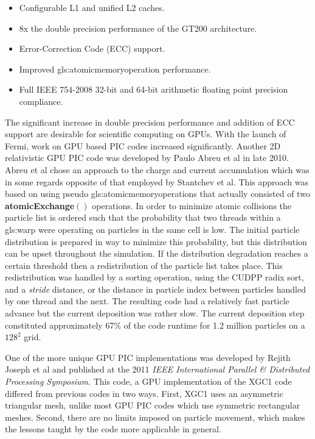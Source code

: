 \begin{itemize}
\singlespacing
\item Configurable L1 and unified L2 caches.
\item 8x the double precision performance of the GT200 architecture. 
\item Error-Correction Code (ECC) support. 
\item Improved \gls{gls:atomicmemoryoperation} performance.
\item Full IEEE 754-2008 32-bit and 64-bit arithmetic floating point precision compliance. 
\end{itemize}

The significant increase in double precision performance and addition of ECC support are desirable for scientific computing on GPUs. With the launch of Fermi, work on GPU based PIC codes increased significantly. Another 2D relativistic GPU PIC code was developed by Paulo Abreu et al in late 2010.\cite{Abreu2011} Abreu et al chose an approach to the charge and current accumulation which was in some regards opposite of that employed by Stantchev et al. This approach was based on using pseudo \glspl{gls:atomicmemoryoperation} that actually consisted of two \textbf{atomicExchange}$()$ operations. In order to minimize atomic collisions the particle list is ordered such that the probability that two threads within a \gls{gls:warp} were operating on particles in the same cell is low. The initial particle distribution is prepared in way to minimize this probability, but this distribution can be upset throughout the simulation. If the distribution degradation reaches a certain threshold then a redistribution of the particle list takes place. This redistribution was handled by a sorting operation, using the CUDPP radix sort, and a \emph{stride} distance, or the distance in particle index between particles handled by one thread and the next. The resulting code had a relatively fast particle advance but the current deposition was rather slow. The current deposition step constituted approximately 67\% of the code runtime for 1.2 million particles on a $128^2$ grid.

One of the more unique GPU PIC implementations was developed by Rejith Joseph et al and published at the 2011 \emph{IEEE International Parallel \& Distributed Processing Symposium}.\cite{Joseph2011} This code, a GPU implementation of the XGC1 code differed from previous codes in two ways. First, XGC1 uses an asymmetric triangular mesh, unlike most GPU PIC codes which use symmetric rectangular meshes. Second, there are no limits imposed on particle movement, which makes the lessons taught by the code more applicable in general.

